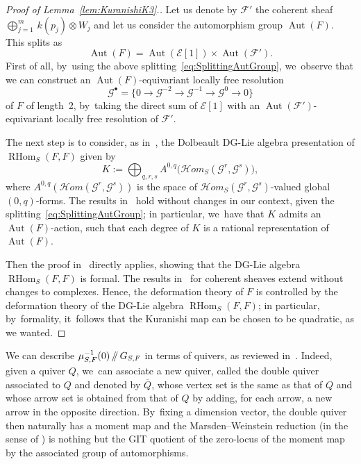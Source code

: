 \documentclass[11pt]{article}
\providecommand\sslash{\mathop{/\mkern-5.5mu/}}
\newcommand{\sbullet}{{\scriptscriptstyle\bullet}}
\newcommand\cE{\mathcal{E}}
\newcommand\cF{\mathcal{F}}
\newcommand\cG{\mathcal{G}}
\DeclareMathOperator{\Aut}{Aut}
\DeclareMathOperator{\RHom}{RHom}
\theoremstyle{definition}
\begin{document}
\begin{proof}[Proof of Lemma~\ref{lem:KuranishiK3}.]
Let us denote by $\cF'$ the coherent sheaf $\bigoplus_{j=1}^m\, k(p_j)\otimes W_j$ and let us consider the automorphism group $\Aut(F)$.
This splits as
\begin{equation}\label{eq:SplittingAutGroup}
\Aut(F) = \Aut(\cE[1]) \times \Aut(\cF').
\end{equation}
First of all, by~using the above splitting~\eqref{eq:SplittingAutGroup}, we~observe that we can construct an $\Aut(F)$-equivariant locally free resolution
\[
\cG^\sbullet=\{0\to \cG^{-2} \to \cG^{-1} \to \cG^0 \to 0 \}
\]
of $F$ of length~2, by~taking the direct sum of $\cE[1]$ with an $\Aut(\cF')$-equivariant locally free resolution of $\cF'$.

The next step is to consider, as in~\cite[\S 5]{BMM:Formality}, the Dolbeault DG-Lie algebra presentation of $\RHom_S(F,F)$ given by
\[
K:=\bigoplus_{q,r,s} A^{0,q}\bigl(\mathcal{H}om_S(\cG^r,\cG^s) \bigr),
\]
where $A^{0,q}(\mathcal{H}om(\cG^r,\cG^s))$ is the space of $\mathcal{H}om_S(\cG^r,\cG^s)$-valued global $(0,q)$-forms.
The results in~\cite[\S 3]{BMM:Quadraticity} hold without changes in our context, given the splitting~\eqref{eq:SplittingAutGroup}; in particular, we~have that $K$ admits an $\Aut(F)$-action, such that each degree of $K$ is a rational representation of $\Aut(F)$.

Then the proof in~\cite[Th.\,5.1]{BMM:Formality} directly applies, showing that the DG-Lie algebra $\RHom_S(F,F)$ is formal.
The results in~\cite{FIM:dgla} for coherent sheaves extend without changes to complexes. Hence, the deformation theory of $F$ is controlled by the deformation theory of the DG-Lie algebra $\RHom_S(F,F)$; in particular, by~formality, it~follows that the Kuranishi map can be chosen to be quadratic, as we wanted.
\end{proof}

We can describe $\mu^{-1}_{S,F}(0)\sslash G_{S,F}$ in terms of quivers, as reviewed in~\cite[\S 4]{AS:Formality}.
Indeed, given a quiver $Q$, we~can associate a new quiver, called the double quiver associated to $Q$ and denoted by $\overline{Q}$, whose vertex set is the same as that of $Q$ and whose arrow set is obtained from that of $Q$ by adding, for each arrow, a new arrow in the opposite direction. By~fixing a dimension vector, the double quiver then naturally has a moment map and the Marsden--Weinstein reduction (in the sense of \hbox{\cite[\S 1]{CB:normality}}) is nothing but the GIT quotient of the zero-locus of the moment map by the associated group of automorphisms.
\end{document}
